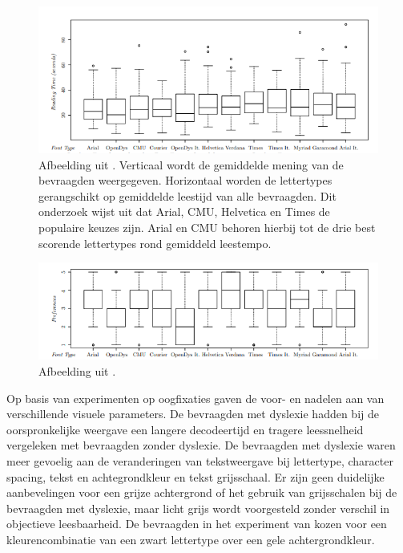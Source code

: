 \begin{figure}[H]
	\includegraphics{img/fonts-readability.png}
	\caption{Afbeelding uit \textcite{Rello2013b}. Verticaal wordt de gemiddelde mening van de bevraagden weergegeven. Horizontaal worden de lettertypes gerangschikt op gemiddelde leestijd van alle bevraagden. Dit onderzoek wijst uit dat Arial, CMU, Helvetica en Times de populaire keuzes zijn. Arial en CMU behoren hierbij tot de drie best scorende lettertypes rond gemiddeld leestempo.}
\end{figure}

\begin{figure}[H]
	\includegraphics{img/fonts-preference.png}
	\caption{Afbeelding uit \textcite{Rello2013b}.}
\end{figure}

Op basis van experimenten op oogfixaties gaven \textcite{Rello2015} de voor- en nadelen aan van verschillende visuele parameters. De bevraagden met dyslexie hadden bij de oorspronkelijke weergave een langere decodeertijd en tragere leessnelheid vergeleken met bevraagden zonder dyslexie. De bevraagden met dyslexie waren meer gevoelig aan de veranderingen van tekstweergave bij lettertype, character spacing, tekst en achtegrondkleur en tekst grijsschaal. Er zijn geen duidelijke aanbevelingen voor een grijze achtergrond of het gebruik van grijsschalen bij de bevraagden met dyslexie, maar licht grijs wordt voorgesteld zonder verschil in objectieve leesbaarheid. De bevraagden in het experiment van \textcite{Rello2015} kozen voor een kleurencombinatie van een zwart lettertype over een gele achtergrondkleur.

